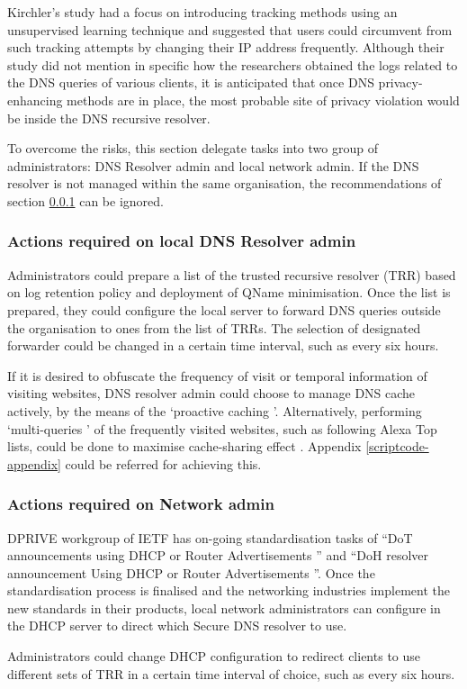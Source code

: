 Kirchler's study had a focus on introducing tracking methods using an unsupervised learning technique and suggested that users could circumvent from such tracking attempts by changing their IP address frequently.
Although their study did not mention in specific how the researchers obtained the logs related to the DNS queries of various clients, it is anticipated that once DNS privacy-enhancing methods are in place, the most probable site of privacy violation would be inside the DNS recursive resolver.

To overcome the risks, this section delegate tasks into two group of administrators: DNS Resolver admin and local network admin.
If the DNS resolver is not managed within the same organisation, the recommendations of section \ref{dnsresolveradmin} can be ignored.

\subsubsection{Actions required on local DNS Resolver admin}\label{dnsresolveradmin}
Administrators could prepare a list of the trusted recursive resolver (TRR) based on log retention policy and deployment of QName minimisation.
Once the list is prepared, they could configure the local server to forward DNS queries outside the organisation to ones from the list of TRRs.
The selection of designated forwarder could be changed in a certain time interval, such as every six hours.

If it is desired to obfuscate the frequency of visit or temporal information of visiting websites, DNS resolver admin could choose to manage DNS cache actively, by the means of the `proactive caching \cite{cohen2003proactive}'. Alternatively, performing `multi-queries \cite{siby2018dns}' of the frequently visited websites, such as following Alexa Top lists, could be done to maximise cache-sharing effect \cite{wang2013analysis}. Appendix \ref{scriptcode-appendix} could be referred for achieving this.

\subsubsection{Actions required on Network admin}
DPRIVE workgroup of IETF has on-going standardisation tasks of ``DoT announcements using DHCP or Router Advertisements \cite{peterson-dot-dhcp-00}'' and ``DoH resolver announcement Using DHCP or Router Advertisements \cite{peterson-doh-dhcp-00}''.
Once the standardisation process is finalised and the networking industries implement the new standards in their products, local network administrators can configure in the DHCP server to direct which Secure DNS resolver to use.

Administrators could change DHCP configuration to redirect clients to use different sets of TRR in a certain time interval of choice, such as every six hours.